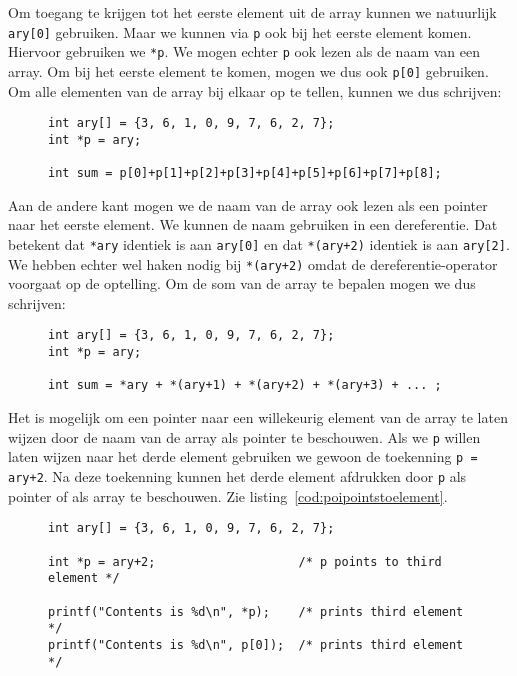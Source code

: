 Om toegang te krijgen tot het eerste element uit de array kunnen we natuurlijk \texttt{ary[0]} gebruiken. Maar we kunnen via \texttt{p} ook bij het eerste element komen. Hiervoor gebruiken we \texttt{*p}. We mogen echter \texttt{p} ook lezen als de naam van een array. Om bij het eerste element te komen, mogen we dus ook \texttt{p[0]} gebruiken. Om alle elementen van de array bij elkaar op te tellen, kunnen we dus schrijven:

\begin{figure}[!ht]
\begin{lstlisting}[caption=Bepalen van de som van elementen in een array.,label=cod:poiarrayandpointersym]
int ary[] = {3, 6, 1, 0, 9, 7, 6, 2, 7};
int *p = ary;

int sum = p[0]+p[1]+p[2]+p[3]+p[4]+p[5]+p[6]+p[7]+p[8];
\end{lstlisting}
\end{figure}

Aan de andere kant mogen we de naam van de array ook lezen als een pointer naar het eerste element. We kunnen de naam gebruiken in een dereferentie. Dat betekent dat \texttt{*ary} identiek is aan \texttt{ary[0]} en dat \texttt{*(ary+2)} identiek is aan \texttt{ary[2]}. We hebben echter wel haken nodig bij \texttt{*(ary+2)} omdat de dereferentie-operator voorgaat op de optelling. Om de som van de array te bepalen mogen we dus schrijven:

\begin{figure}[!ht]
\begin{lstlisting}[caption=Bepalen van de som van elementen in een array.,label=cod:poiarrayandpointersym2]
int ary[] = {3, 6, 1, 0, 9, 7, 6, 2, 7};
int *p = ary;

int sum = *ary + *(ary+1) + *(ary+2) + *(ary+3) + ... ;
\end{lstlisting}
\end{figure}

Het is mogelijk om een pointer naar een willekeurig element van de array te laten wijzen door de naam van de array als pointer te beschouwen. Als we \texttt{p} willen laten wijzen naar het derde element gebruiken we gewoon de toekenning \texttt{p = ary+2}. Na deze toekenning kunnen het derde element afdrukken door \texttt{p} als pointer of als array te beschouwen. Zie listing~\ref{cod:poipointstoelement}.

\begin{figure}[!ht]
\begin{lstlisting}[caption=Pointer die naar een element in een array wijst.,label=cod:poipointstoelement]
int ary[] = {3, 6, 1, 0, 9, 7, 6, 2, 7};

int *p = ary+2;                    /* p points to third element */

printf("Contents is %d\n", *p);    /* prints third element */
printf("Contents is %d\n", p[0]);  /* prints third element */
\end{lstlisting}
\end{figure}

